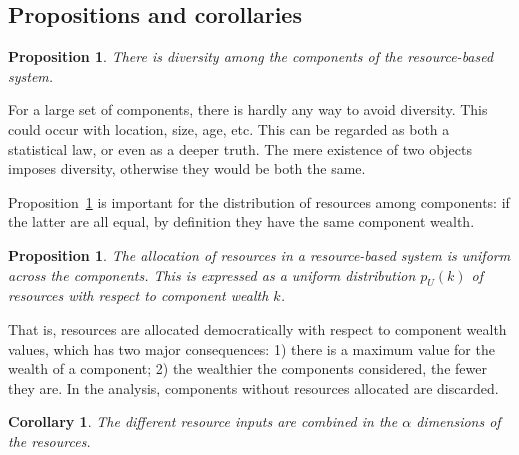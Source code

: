 \documentclass[a4paper, 11pt]{article} %
\newtheorem{proposition}[theorem]{Proposition}
\newtheorem{corollary}[theorem2]{Corollary}
\begin{document}
\subsection{Propositions and corollaries}

\setcounter{theorem}{-1}
\begin{proposition}\label{prop:0}
	There is diversity among the components of the resource-based system.
\end{proposition}

For a large set of components, there is hardly any way to avoid diversity. This could occur with location, size, age, etc. This can be regarded as both a statistical law, or even as a deeper truth.
The mere existence of two objects imposes diversity,
otherwise they would be both the same.

Proposition~\ref{prop:0} is important for the distribution of resources among components: if the latter are all equal, by definition they have the same component wealth.

\begin{proposition}\label{prop:2}
	The allocation of resources in a resource-based system is uniform across the components. This is expressed as a uniform distribution $p_U(k)$ of resources with respect to component wealth $k$.
\end{proposition}

That is, resources are allocated democratically with respect to component wealth values, which has two major consequences: 1) there is a maximum value for the wealth of a component; 
2) the wealthier the components considered, the fewer they are. 
In the analysis, components without resources allocated are discarded.

\begin{corollary}\label{prop:1}
	The different resource inputs are combined in the $\alpha$ dimensions of the resources.
\end{corollary}



%
\end{document}
